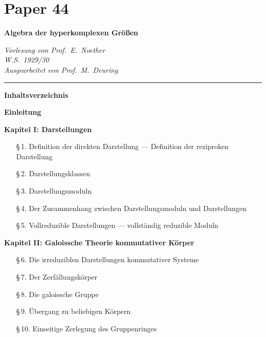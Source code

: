 \documentclass[10pt,a4paper]{article}
\theoremstyle{plain}
\theoremstyle{definition}
\theoremstyle{remark}
\begin{document}
\section*{Paper 44}

\begin{center}
\Large\bfseries Algebra der hyperkomplexen Gr\"o\ss en
\end{center}

\begin{center}
\textit{Vorlesung von Prof.\ E.\ Noether}\\[0.3em]
\textit{W.S.\ 1929/30}\\[0.3em]
\textit{Ausgearbeitet von Prof.\ M.\ Deuring}
\end{center}

\medskip
\noindent\rule{\textwidth}{0.4pt}

\begin{center}\textbf{Inhaltsverzeichnis}\end{center}

\smallskip
\textbf{Einleitung}

\textbf{Kapitel I: Darstellungen}
\begin{itemize}[nosep]
\item[\S\,1.] Definition der direkten Darstellung --- Definition der reziproken Darstellung
\item[\S\,2.] Darstellungsklassen
\item[\S\,3.] Darstellungsmoduln
\item[\S\,4.] Der Zusammenhang zwischen Darstellungsmoduln und Darstellungen
\item[\S\,5.] Vollreduzible Darstellungen --- vollst\"andig reduzible Moduln
\end{itemize}

\textbf{Kapitel II: Galoissche Theorie kommutativer K\"orper}
\begin{itemize}[nosep]
\item[\S\,6.] Die irreduziblen Darstellungen kommutativer Systeme
\item[\S\,7.] Der Zerf\"allungsk\"orper
\item[\S\,8.] Die galoissche Gruppe
\item[\S\,9.] \"Ubergang zu beliebigen K\"orpern
\item[\S\,10.] Einseitige Zerlegung des Gruppenringes
\end{itemize}
\end{document}

